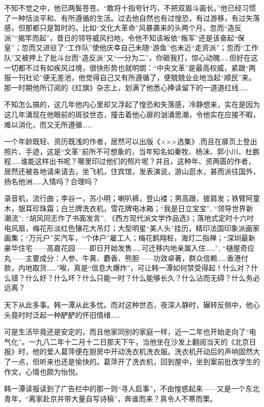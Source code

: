 \par 不知不觉之中，他已两鬓苍苍。“敢将十指夸针巧，不把双眉斗画长。”他已经习惯了一种恬淡平和、有所遵循的生活。过去他自然也有过惶恐，有过游移，有过失落感，但那都只是暂时的。比如“文化大革命”风暴袭来的头两个月，忽而“造反派”“揭竿而起”，昔日的领导威风扫地，令他不知该皈依“叛军”还是该奋起“保皇”；忽而又进驻了“工作队”使他庆幸自己未随“游鱼”也未近“走资派”；忽而“工作队”又被押上了批斗台而“造反派”又“一分为二”，你砸我打，惊心动魄……但好在这一切都不过有如疾风过境，很快形势也就明朗：“中央文革”是最高权威，紧跟“两报一刊社论”便无差池，他觉得自己又有所遵循了，便兢兢业业地当起“顺民”来。那一时期他所订阅的《红旗》杂志上，划满了他悉心捧读留下的一道道红线……
\par 不知怎么搞的，这几年他内心里却又浮起了惶恐和失落感，冷静想来，实在是因为这几年涌现在他眼前的斑驳世态，撞击着他心扉的汹涌思潮，令他实在应接不暇，难以消化，而又无所遵循……
\par 一个年龄既轻、资历既浅的作者，居然可以出版《×××选集》,而且在扉页上登出照片、手迹，这是“文革”前所不可想象的，当年知名如秦牧、杨沫、郭小川、杜鹏程……谁能这样出书呢？哪里印过他们的照片呢？并且，这种年、资两匮的作者，居然还被各地请来请去，坐飞机，住宾馆，发表演说，游山逛水，甚而派往国外，扬名他洲……入情吗？合理吗？
\par 录音机，流行曲；李谷一，苏小明；喇叭裤，登山褛；男高跟，披肩发；铁臂阿童木，银耳珍珠霜；白兰牌洗衣机，雪花牌电冰箱；“我是日立宝宝”, “领导世界新潮流”; “胡风同志作了书面发言”, 《西方现代派文学作品选》；落地式定时十六吋电风扇，梅花形淡红色镶花大吊灯；大型明星“美人头”挂历，精印法国印象派画家画集；“万元户”买汽车，“个体户”雇工人；梅花鹤翔桩，海灯二指禅；“深圳最新豪华住宅——高嘉花园——即日开始发售……可迁移内地亲属入住……”, “樋屋奇应丸——主要成分：人参、牛黄、麝香、熊胆——功效卓著，群众信赖……香港付款，内地取货……”唉，真是“信息大爆炸”，可让韩一潭如何禁受得起！什么对？什么错？什么好？什么坏？什么只能一时？什么能够长久？什么沾而无碍？什么务必远离？
\par 天下从此多事。韩一潭从此多忧。而对这种世态，夜深人静时，辗转反侧中，他心头竟时时泛起一种酽酽的怀旧情绪……
\par 可是生活毕竟还是安定的，而且他家同别的家庭一样，近一二年也开始走向了“电气化”。一九八二年十二月十二日那天下午，当他坐在沙发上翻阅当天的《北京日报》时，他的爱人葛萍便在厨房中开动洗衣机洗衣服。洗衣机开动后的声响固然大了一点，但听来也还是愉快的。葛萍开了洗衣机，回到屋中，坐到案前批改学生的作文，心情也颇为怡悦。
\par 韩一潭读报读到了广告栏中的那一则“寻人启事”，不由惶惑起来——又是一个东北青年，“离家赴京并带大量自写诗稿”，奔谁而来？真令人不寒而栗。
